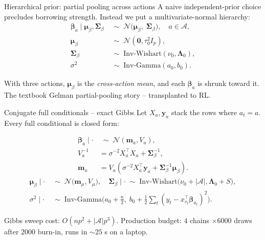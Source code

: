 \documentclass[10pt,aspectratio=169]{beamer}
\newcommand{\N}{\mathcal{N}}
\newcommand{\IG}{\mathrm{Inv\text{-}Gamma}}
\newcommand{\IW}{\mathrm{Inv\text{-}Wishart}}
\newcommand{\A}{\mathcal{A}}
\begin{document}
\begin{frame}{Hierarchical prior: partial pooling across actions}
A naive independent-prior choice precludes borrowing strength. Instead
we put a multivariate-normal hierarchy:
\begin{align}
\bm{\beta}_a \mid \bm{\mu}_\beta, \bm{\Sigma}_\beta &\;\sim\;
\N\!\big(\bm{\mu}_\beta,\; \bm{\Sigma}_\beta\big),\quad a \in \A,\\
\bm{\mu}_\beta &\;\sim\; \N(\bm 0, \tau_0^2 I_p), \\
\bm{\Sigma}_\beta &\;\sim\; \IW(\nu_0, \bm\Lambda_0), \\
\sigma^2 &\;\sim\; \IG(a_0, b_0).
\end{align}

\medskip
With three actions, $\bm\mu_\beta$ is the \emph{cross-action mean}, and
each $\bm\beta_a$ is shrunk toward it. The textbook Gelman partial-pooling
story -- transplanted to RL.
\end{frame}

\begin{frame}{Conjugate full conditionals -- exact Gibbs}
Let $X_a, \bm y_a$ stack the rows where $a_t = a$. Every full
conditional is closed form:

\begin{align*}
\bm\beta_a \mid \cdot &\;\sim\; \N(\bm m_a, V_a), \\
V_a^{-1} &= \sigma^{-2} X_a^\top X_a + \bm\Sigma_\beta^{-1}, \\
\bm m_a &= V_a\!\left(\sigma^{-2} X_a^\top \bm y_a + \bm\Sigma_\beta^{-1}\bm\mu_\beta\right).
\end{align*}
\begin{align*}
\bm\mu_\beta \mid \cdot &\;\sim\; \N\!\big(\bm m_\mu, V_\mu\big), \quad
\bm\Sigma_\beta \mid \cdot \;\sim\; \IW\!\big(\nu_0 + |\A|, \bm\Lambda_0 + S\big), \\
\sigma^2 \mid \cdot &\;\sim\; \IG\!\big(a_0 + \tfrac{n}{2},\; b_0 + \tfrac{1}{2}\textstyle\sum_t (y_t - x_{s_t}^\top \bm\beta_{a_t})^2 \big).
\end{align*}

\medskip
\alert{Gibbs sweep cost:} $O(n p^2 + |\A| p^3)$. Production budget:
$4$ chains $\times 6000$ draws after $2000$ burn-in, runs in
$\sim 25$ s on a laptop.
\end{frame}
\end{document}
